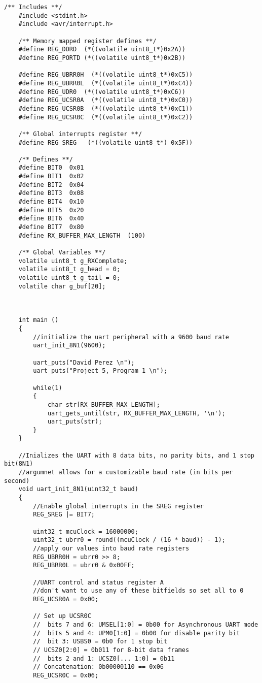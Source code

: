 \documentclass[11pt,pdftex,portrait,letterpaper]{article}
\begin{document}
	\begin{lstlisting}[caption={Program 1}, label=l:programx]
	/** Includes **/
	#include <stdint.h>
	#include <avr/interrupt.h>
	
	/** Memory mapped register defines **/
	#define REG_DDRD  (*((volatile uint8_t*)0x2A))
	#define REG_PORTD (*((volatile uint8_t*)0x2B))
	
	#define REG_UBRR0H  (*((volatile uint8_t*)0xC5))
	#define REG_UBRR0L  (*((volatile uint8_t*)0xC4))
	#define REG_UDR0  (*((volatile uint8_t*)0xC6))
	#define REG_UCSR0A  (*((volatile uint8_t*)0xC0))
	#define REG_UCSR0B  (*((volatile uint8_t*)0xC1))
	#define REG_UCSR0C  (*((volatile uint8_t*)0xC2))
	
	/** Global interrupts register **/
	#define REG_SREG   (*((volatile uint8_t*) 0x5F))
	
	/** Defines **/
	#define BIT0  0x01
	#define BIT1  0x02
	#define BIT2  0x04
	#define BIT3  0x08
	#define BIT4  0x10
	#define BIT5  0x20
	#define BIT6  0x40
	#define BIT7  0x80
	#define RX_BUFFER_MAX_LENGTH  (100)
	
	/** Global Variables **/
	volatile uint8_t g_RXComplete;
	volatile uint8_t g_head = 0;
	volatile uint8_t g_tail = 0;
	volatile char g_buf[20];
	
	
	
	int main ()
	{
		//initialize the uart peripheral with a 9600 baud rate
		uart_init_8N1(9600);
		
		uart_puts("David Perez \n");
		uart_puts("Project 5, Program 1 \n");
		
		while(1)
		{
			char str[RX_BUFFER_MAX_LENGTH];
			uart_gets_until(str, RX_BUFFER_MAX_LENGTH, '\n');
			uart_puts(str);
		}
	}
	
	//Inializes the UART with 8 data bits, no parity bits, and 1 stop bit(8N1)
	//argumnet allows for a customizable baud rate (in bits per second)
	void uart_init_8N1(uint32_t baud)
	{
		//Enable global interrupts in the SREG register
		REG_SREG |= BIT7;
		
		uint32_t mcuClock = 16000000;
		uint32_t ubrr0 = round((mcuClock / (16 * baud)) - 1);
		//apply our values into baud rate registers
		REG_UBRR0H = ubrr0 >> 8;
		REG_UBRR0L = ubrr0 & 0x00FF;
		
		//UART control and status register A
		//don't want to use any of these bitfields so set all to 0
		REG_UCSR0A = 0x00;
		
		// Set up UCSR0C
		//  bits 7 and 6: UMSEL[1:0] = 0b00 for Asynchronous UART mode
		//  bits 5 and 4: UPM0[1:0] = 0b00 for disable parity bit
		//  bit 3: USBS0 = 0b0 for 1 stop bit
		// UCSZ0[2:0] = 0b011 for 8-bit data frames
		//  bits 2 and 1: UCSZ0[... 1:0] = 0b11
		// Concatenation: 0b00000110 == 0x06
		REG_UCSR0C = 0x06;
		

\end{lstlisting}
\end{document}
